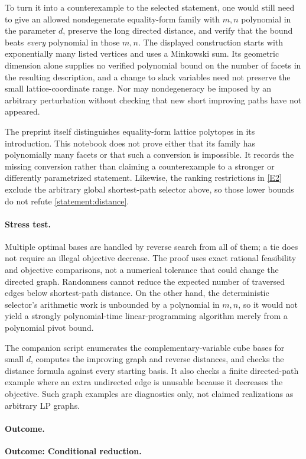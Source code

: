 \documentclass[11pt,a4paper]{article}
\newcommand{\eref}[2]{\hyperlink{extra:#1:#2}{[E#2]}}
\numberwithin{equation}{section}
\begin{document}
To turn it into a counterexample to the selected statement, one would
still need to give an allowed nondegenerate equality-form family with
$m,n$ polynomial in the parameter $d$, preserve the long directed
distance, and verify that the bound beats \emph{every} polynomial in
those $m,n$.  The displayed construction starts with exponentially
many listed vertices and uses a Minkowski sum.  Its geometric dimension
alone supplies no verified polynomial bound on the number of facets
in the resulting description, and a change to slack variables need
not preserve the small lattice-coordinate range.  Nor may
nondegeneracy be imposed by an arbitrary perturbation without checking
that new short improving paths have not appeared.

The preprint itself distinguishes equality-form lattice polytopes in
its introduction.  This notebook does not prove either that its family
has polynomially many facets or that such a conversion is impossible.
It records the missing conversion rather than claiming a counterexample
to a stronger or differently parametrized statement.  Likewise, the
ranking restrictions in \eref{statement}{2} exclude the arbitrary global
shortest-path selector above, so those lower bounds do not refute
\eqref{statement:distance}.

\paragraph{Stress test.}
Multiple optimal bases are handled by reverse search from all of them;
a tie does not require an illegal objective decrease.  The proof uses
exact rational feasibility and objective comparisons, not a numerical
tolerance that could change the directed graph.  Randomness cannot
reduce the expected number of traversed edges below shortest-path
distance.  On the other hand, the deterministic selector's arithmetic
work is unbounded by a polynomial in $m,n$, so it would not yield a
strongly polynomial-time linear-programming algorithm merely from a
polynomial pivot bound.

The companion script enumerates the complementary-variable cube bases
for small $d$, computes the improving graph and reverse distances, and
checks the distance formula against every starting basis.  It also
checks a finite directed-path example where an extra undirected edge
is unusable because it decreases the objective.  Such graph examples
are diagnostics only, not claimed realizations as arbitrary LP graphs.

\paragraph{Outcome.}
\textbf{Outcome: Conditional reduction.}
\end{document}
